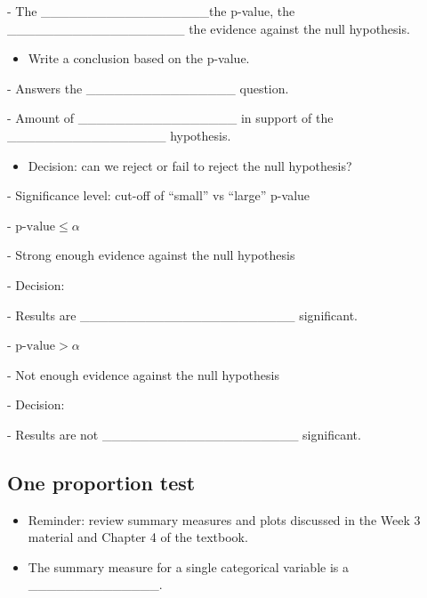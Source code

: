 \documentclass[
]{report}
\providecommand{\tightlist}{%
  \setlength{\itemsep}{0pt}\setlength{\parskip}{0pt}}
\newcommand{\rgi}{\hspace{24pt}}  %
\begin{document}
\rgi \rgi - The \_\_\_\_\_\_\_\_\_\_\_\_\_\_\_\_\_\_the p-value, the \_\_\_\_\_\_\_\_\_\_\_\_\_\_\_\_\_\_\_ the evidence against the null hypothesis.

\begin{itemize}
\tightlist
\item
  Write a conclusion based on the p-value.
\end{itemize}

\rgi \rgi - Answers the \_\_\_\_\_\_\_\_\_\_\_\_\_\_\_\_ question.

\rgi \rgi - Amount of \_\_\_\_\_\_\_\_\_\_\_\_\_\_\_\_\_ in support of the \_\_\_\_\_\_\_\_\_\_\_\_\_\_\_\_\_ hypothesis.

\begin{itemize}
\tightlist
\item
  Decision: can we reject or fail to reject the null hypothesis?
\end{itemize}

\rgi - Significance level: cut-off of ``small'' vs ``large'' p-value

\rgi \rgi - \(\text{p-value} \le \alpha\)

\rgi \rgi \rgi - Strong enough evidence against the null hypothesis

\rgi \rgi \rgi - Decision:

\vspace{0.2in}

\rgi \rgi \rgi - Results are \_\_\_\_\_\_\_\_\_\_\_\_\_\_\_\_\_\_\_\_\_\_\_ significant.

\rgi \rgi - \(\text{p-value} > \alpha\)

\rgi \rgi \rgi - Not enough evidence against the null hypothesis

\rgi \rgi \rgi - Decision:

\vspace{0.17in}

\rgi \rgi \rgi - Results are not \_\_\_\_\_\_\_\_\_\_\_\_\_\_\_\_\_\_\_\_\_ significant.


\subsection*{One proportion test}\label{one-proportion-test}

\begin{itemize}
\item
  Reminder: review summary measures and plots discussed in the Week 3 material and Chapter 4 of the textbook.
\item
  The summary measure for a single categorical variable is a \_\_\_\_\_\_\_\_\_\_\_\_\_\_.
\end{itemize}
\end{document}
